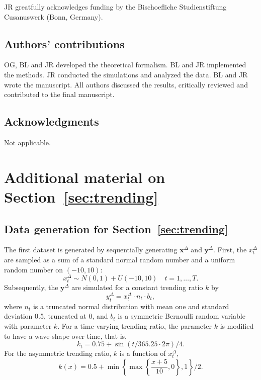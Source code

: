 \documentclass[pdflatex]{sn-jnl}
\theoremstyle{plain}%
\theoremstyle{definition}
\newcommand{\diffx}{\mathbf{x}^{\Delta}}
\newcommand{\diffy}{\mathbf{y}^{\Delta}}
\newcommand{\diffxt}[1][t]{x^{\Delta}_{#1}}
\newcommand{\diffyt}[1][t]{y^{\Delta}_{#1}}
\begin{document}
JR greatfully acknowledges funding by the Bischoefliche Studienstiftung Cusanuswerk (Bonn, Germany).

\subsection*{Authors' contributions}

OG, BL and JR developed the theoretical formalism.
BL and JR implemented the methods.
JR conducted the simulations and analyzed the data.
BL and JR wrote the manuscript.
All authors discussed the results, critically reviewed and contributed to the final manuscript.

\subsection*{Acknowledgments}

Not applicable.

\printbibliography
%

\appendix

\section{Additional material on Section~\ref{sec:trending}}\label{sec:appendix-trending}

\subsection{Data generation for Section~\ref{sec:trending}}\label{subsec:app-trending-data-generation}

The first dataset is generated by sequentially generating $\diffx$ and $\diffy$.
First, the $\diffxt$ are sampled as a sum of a standard normal random number and a uniform random number on $(-10, 10)$:
\begin{equation*}
    \diffxt \sim N(0, 1) + U(-10, 10) \quad t = 1, \dots, T.
\end{equation*}
Subsequently, the $\diffy$ are simulated for a constant trending ratio $k$ by
\begin{equation*}
    \diffyt = \diffxt \cdot n_t \cdot b_t,
\end{equation*}
where $n_t$ is a truncated normal distribution with mean one and standard deviation 0.5, truncated at 0, and $b_t$ is a symmetric Bernoulli random variable with parameter $k$.
For a time-varying trending ratio, the parameter $k$ is modified to have a wave-shape over time, that is,
\begin{equation*}
    k_t = 0.75 + \sin(t / 365.25 \cdot 2 \pi) / 4.
\end{equation*}
For the asymmetric trending ratio, $k$ is a function of $\diffxt$,
\begin{equation*}
    k(x) = 0.5 + \min \left\{ \max \left\{ \frac{x + 5}{10}, 0  \right\} , 1 \right\} / 2.
\end{equation*}
\end{document}
